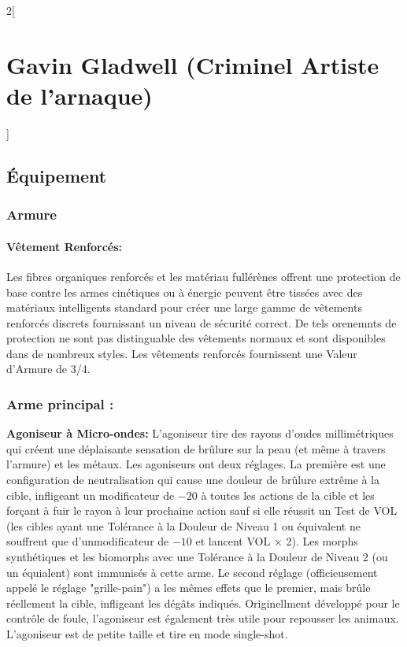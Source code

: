 \documentclass[a4paper,9pt]{article}
\begin{document}
\begin{multicols}{2}[\section*{Gavin Gladwell (Criminel Artiste de l'arnaque)}]
   \subsection*{Équipement}

   \subsubsection*{Armure}

   \paragraph{Vêtement Renforcés:} Les fibres organiques renforcés et les matériau
   fullérènes offrent une protection de base contre les armes cinétiques ou à
   énergie peuvent être tissées avec des matériaux intelligents standard pour
   créer une large gamme de vêtements renforcés discrets fournissant un niveau de
   sécurité correct. De tels orenemnts de protection ne sont pas distinguable des
   vêtements normaux et sont disponibles dans de nombreux styles. Les vêtements
   renforcés fournissent une Valeur d'Armure de 3/4.

   \subsubsection*{Arme principal :}

   \textbf{Agoniseur à Micro-ondes:} L'agoniseur tire des rayons d'ondes
   millimétriques qui créent une déplaisante sensation de brûlure sur la peau  (et
   même à travers l'armure) et les métaux. Les agoniseurs ont deux réglages. La
   première est une configuration de neutralisation qui cause une douleur de
   brûlure extrême à la cible, infligeant un modificateur de $-20$ à toutes les
   actions de la cible et les forçant à fuir le rayon à leur prochaine action sauf
   si elle réussit un Test de VOL (les cibles ayant une Tolérance à la Douleur de
   Niveau 1 ou équivalent ne souffrent que d'unmodificateur de $-10$ et lancent
   VOL $\times$ 2). Les morphs synthétiques et les biomorphs avec une Tolérance à
   la Douleur de Niveau 2 (ou un équialent) sont immunisés à cette arme. Le second
   réglage (officieusement appelé le réglage "grille-pain") a les mêmes effets que
   le premier, mais brûle réellement la cible, infligeant les dégâts indiqués.
   Originellment développé pour le contrôle de foule, l'agoniseur est également
   très utile pour repousser les animaux. L'agoniseur est de petite taille et tire
   en mode single-shot.


\end{multicols}
\end{document}
